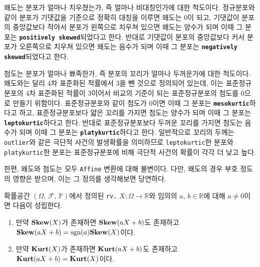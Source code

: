 왜도는 분포가 얼마나 치우쳤는가, 즉 얼마나 비대칭인가에 대한 척도이다. 정규분포와 같이 분포가 기댓값을 기준으로 정확히 대칭을 이루면 왜도는 $0$이 되고, 기댓값이 분포의 중앙값보다 작아서 분포가 왼쪽으로 치우쳐 있으면 왜도는 양수가 되며 이때 그 분포는 \textbf{\texttt{positively skewed}}되었다고 한다. 반대로 기댓값이 분포의 중앙값보다 커서 분포가 오른쪽으로 치우쳐 있으면 왜도는 음수가 되며 이때 그 분포는 \textbf{\texttt{negatively skewed}}되었다고 한다.

첨도는 분포가 얼마나 뾰족한가, 즉 분포의 꼬리가 얼마나 두꺼운가에 대한 척도이다. 왜도와는 달리 $4$차 표준화된 적률에서 $3$을 뺀 것으로 정의되어 있는데, 이는 표준정규분포의 $4$차 표준화된 적률이 $3$이어서 비교의 기준이 되는 표준정규분포의 첨도를 $0$으로 만들기 위함이다. 표준정규분포와 같이 첨도가 $0$이면 이때 그 분포는 \textbf{\texttt{mesokurtic}}하다고 하고, 표준정규분포보다 얇은 꼬리를 가지면 첨도는 양수가 되며 이때 그 분포는 \textbf{\texttt{leptokurtic}}하다고 한다. 반대로 표준정규분포보다 두꺼운 꼬리를 가지면 첨도는 음수가 되며 이때 그 분포는 \textbf{\texttt{platykurtic}}하다고 한다. 일반적으로 꼬리의 두께는 \texttt{outlier}와 같은 극단적 사건의 발생확률을 의미하므로 \texttt{leptokurtic}한 분포와 \texttt{platykurtic}한 분포는 표준정규분포에 비해 극단적 사건의 확률이 각각 더 낮고 높다.

한편, 왜도와 첨도는 모두 \texttt{Affine} 변환에 대해 불변이다. 다만, 왜도의 경우 부호 정도의 영향은 받으며, 이는 그 정의를 생각해보면 당연하다.

\begin{theorem}
    확률공간 $(\Omega,\,\mathcal{F},\,\mathbb{P})$에서 정의된 \texttt{rv.} $X:\Omega\to\mathbb{R}$와 임의의 $a,\,b\in\mathbb{R}$에 대해 $a\ne0$이면 다음이 성립한다.
    \begin{enumerate}
        \item 만약 $\mathbf{Skew}(X)$가 존재하면 $\mathbf{Skew}(aX+b)$도 존재하고 $\mathbf{Skew}(aX+b)=\mathrm{sgn}(a)\mathbf{Skew}(X)$이다.
        \item 만약 $\mathbf{Kurt}(X)$가 존재하면 $\mathbf{Kurt}(aX+b)$도 존재하고 $\mathbf{Kurt}(aX+b)=\mathbf{Kurt}(X)$이다.
    \end{enumerate}
\end{theorem}

